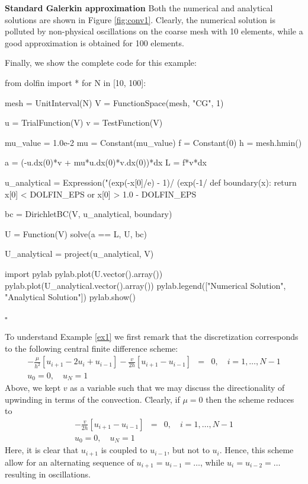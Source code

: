 \begin{example}{\textbf{Standard Galerkin approximation}}
Both the numerical and analytical solutions are shown in Figure \ref{fig:conv1}. Clearly, 
the numerical solution is polluted by non-physical oscillations on the coarse
mesh with 10 elements, while a good approximation is obtained for 100 elements.     


Finally, we show the complete code for this example: 
\begin{python}
from dolfin import *
for N in [10, 100]:

  mesh = UnitInterval(N)
  V = FunctionSpace(mesh, "CG", 1)

  u = TrialFunction(V)
  v = TestFunction(V)

  mu_value = 1.0e-2 
  mu = Constant(mu_value)
  f = Constant(0)
  h = mesh.hmin()

  a = (-u.dx(0)*v + mu*u.dx(0)*v.dx(0))*dx  
  L = f*v*dx  

  u_analytical = Expression("(exp(-x[0]/e) - 1)/ (exp(-1/%
  def boundary(x):
      return x[0] < DOLFIN_EPS or x[0] > 1.0 - DOLFIN_EPS

  bc = DirichletBC(V, u_analytical, boundary) 

  U = Function(V)
  solve(a == L, U, bc) 

  U_analytical = project(u_analytical, V)

  import pylab 
  pylab.plot(U.vector().array())
  pylab.plot(U_analytical.vector().array())
  pylab.legend(["Numerical Solution", "Analytical Solution"])
  pylab.show()
\end{python}
$\square$ 
\end{example}

To understand Example \ref{ex1} we first remark that the discretization corresponds to the following 
central finite difference scheme: 
\begin{eqnarray*}
-\frac{\mu}{h^2}\left[u_{i+1}-2u_i+u_{i-1}\right] - 
\frac{v}{2h}\left[u_{i+1}-u_{i-1}\right] &=& 0, \quad i=1,\ldots,N-1\\
u_0=0,\quad u_N=1 &&
\end{eqnarray*}
Above, we kept $v$ as a variable such that we may discuss the directionality of upwinding in terms of the convection. 
Clearly, if $\mu=0$ then the scheme reduces to  
\begin{eqnarray*}
-\frac{v}{2h}\left[u_{i+1}-u_{i-1}\right] &=& 0, \quad i=1,\ldots,N-1\\
u_0=0,\quad u_N=1 &&
\end{eqnarray*}
Here, it is clear that $u_{i+1}$ is coupled to $u_{i-1}$, but not to 
$u_{i}$. 
Hence, this scheme allow for an alternating
sequence of $u_{i+1}=u_{i-1}=\ldots$, while $u_{i}=u_{i-2}=\ldots$
resulting in oscillations. 

